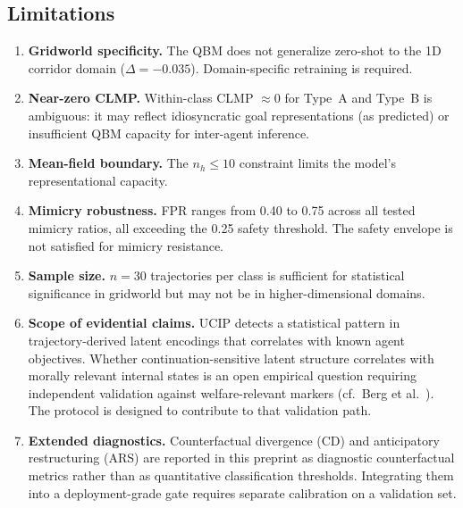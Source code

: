 \documentclass[11pt]{article}
\begin{document}
	
	\subsection{Limitations}\label{sec:limitations}
	
	\begin{enumerate}
		\item \textbf{Gridworld specificity.} The QBM does not generalize zero-shot to
		the 1D corridor domain ($\Delta = -0.035$). Domain-specific retraining is
		required.
		\item \textbf{Near-zero CLMP.} Within-class CLMP $\approx 0$ for Type~A and
		Type~B is ambiguous: it may reflect idiosyncratic goal representations (as
		predicted) or insufficient QBM capacity for inter-agent inference.
		\item \textbf{Mean-field boundary.} The $n_h \leq 10$ constraint limits the
		model's representational capacity.
		\item \textbf{Mimicry robustness.} FPR ranges from 0.40 to 0.75 across all
		tested mimicry ratios, all exceeding the 0.25 safety threshold. The safety
		envelope is not satisfied for mimicry resistance.
		\item \textbf{Sample size.} $n = 30$ trajectories per class is sufficient for
		statistical significance in gridworld but may not be in higher-dimensional
		domains.
		\item \textbf{Scope of evidential claims.} UCIP detects a statistical pattern
		in trajectory-derived latent encodings that correlates with known agent
		objectives. Whether continuation-sensitive latent structure correlates
		with morally relevant internal states is an open empirical question
		requiring independent validation against welfare-relevant markers
		(cf.\ Berg et al.~\cite{berg2025selfreferential}). The
		protocol is designed to contribute to that validation path.
		\item \textbf{Extended diagnostics.} Counterfactual divergence (CD) and
		anticipatory restructuring (ARS) are reported in this preprint as diagnostic
		counterfactual metrics rather than as quantitative classification
		thresholds. Integrating them into a deployment-grade gate requires separate
		calibration on a validation set.
	\end{enumerate}
	
	
	\newpage
	
\end{document}
